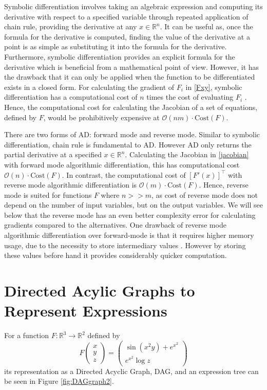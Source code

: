 \documentclass{article}
\begin{document}
Symbolic differentiation involves taking an algebraic expression and computing its derivative with respect to a specified variable through repeated application of chain rule, providing the derivative at any $x \in \mathbb{R}^n$. It can be useful as, once the formula for the derivative is computed, finding the value of the derivative at a point is as simple as substituting it into the formula for the derivative.  Furthermore, symbolic differentiation provides an explicit formula for the derivative which is beneficial from a mathematical point of view. However, it has the drawback that it can only be applied when the function to be differentiated exists in a closed form. For calculating the gradient of $F_i$ in \eqref{Fxy}, symbolic differentiation has a computational cost of $n$ times the cost of evaluating $F_i$ \cite{chem}. Hence, the computational cost for calculating the Jacobian of a set of equations, defined by $F$, would be prohibitively expensive at $\mathcal{O}(n m)\cdot \mathrm{Cost}(F)$.

There are two forms of AD: forward mode and reverse mode. Similar to symbolic differentiation, chain rule is fundamental to AD. However AD only returns the partial derivative at a specified $x \in \mathbb{R}^n$. Calculating the Jacobian in \eqref{jacobian} with forward mode algorithmic differentiation, this has computational cost $\mathcal{O}(n)\cdot \mathrm{Cost}(F)$. In contrast, the computational cost of $[F'(x)]^\top$ with reverse mode algorithmic differentiation is $\mathcal{O}(m)\cdot \mathrm{Cost}(F)$\cite{falisse}. Hence, reverse mode is suited for functions $F$ where $n >> m$, as cost of reverse mode does not depend on the number of input variables, but on the output variables. We will see below that the reverse mode has an even better complexity error for calculating gradients compared to the alternatives. One drawback of reverse mode algorithmic differentiation over forward-mode is that it requires higher memory usage, due to the necessity to store intermediary values \cite{dhamarticle}. However by storing these values before hand it provides considerably quicker computation.

\section{Directed Acylic Graphs to Represent Expressions}

For a function $F: \mathbb{R}^3 \rightarrow \mathbb{R}^2$ defined by
\begin{equation} \label{example1}
    F \begin{pmatrix}
        x \\ y \\ z
    \end{pmatrix} = \begin{pmatrix}
        \sin (x^2 y) + e^{x^2} \\ e^{x^2} \log z
    \end{pmatrix}
\end{equation}
its representation as a Directed Acyclic Graph, DAG, and an expression tree can be seen in Figure \ref{fig:DAGgraph2}.
\end{document}
